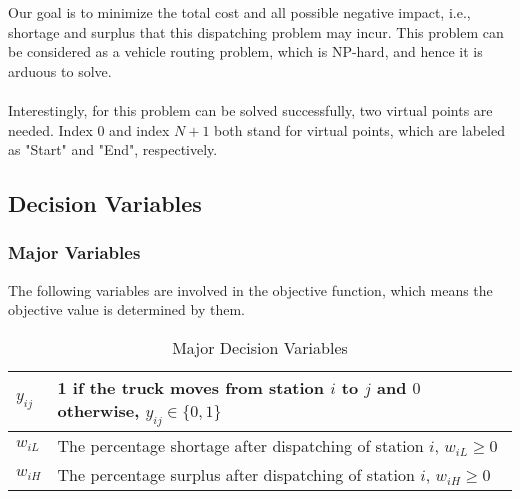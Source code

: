 \documentclass[a4paper, 12pt]{article}%
\theoremstyle{definition}
\begin{document}
Our goal is to minimize the total cost and all possible negative impact, i.e., shortage and surplus that this dispatching problem may incur. This problem can be considered as a vehicle routing problem, which is NP-hard, and hence it is arduous to solve. \\ \\
\noindent Interestingly, for this problem can be solved successfully, two virtual points are needed. Index $0$ and index $N+1$ both stand for virtual points, which are labeled as "Start" and "End", respectively.

\subsection{Decision Variables}


\subsubsection{Major Variables}

The following variables are involved in the objective function, which means the objective value is determined by them.

    \begin{table}[h!]
        \centering
        \begin{tabular}{l|l}
    	\toprule
           $y_{ij}$ &1  if the truck moves from station $i$ to $j$ and $0$ otherwise, $y_{ij} \in \{0,1\}$ \\ \hline
           $w_{iL}$ &  The percentage shortage after dispatching of station $i$, $w_{iL} \geq 0$ \\
            $w_{iH}$& The percentage surplus after dispatching of station $i$, $w_{iH} \geq 0$ \\
    	\bottomrule
        \end{tabular}
        \caption{Major Decision Variables}
        \label{tab:my_labe1l}
    \end{table}
\end{document}
